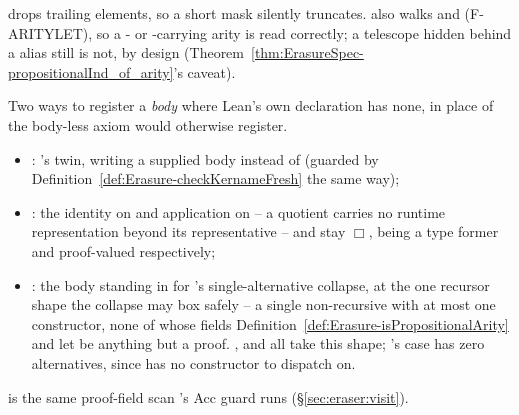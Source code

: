\begin{remark}
  drops trailing elements, so a short mask silently truncates.
 also walks  and  (F-ARITYLET), so a - or
-carrying arity is read correctly; a telescope hidden behind a  alias
still is not, by design (Theorem~\ref{thm:ErasureSpec-propositionalInd_of_arity}'s caveat).
\end{remark}

\begin{definition}
\label{def:Erasure-addRealizer}
\leanok
{} Two ways to register a \lbox{} \emph{body} where Lean's own declaration has none,
in place of the body-less axiom  would otherwise register.
\begin{itemize}
\item {}: 's twin, writing a supplied body instead of 
(guarded by Definition~\ref{def:Erasure-checkKernameFresh} the same way);
\item {}: the identity on  and application on  --
a quotient carries no runtime representation beyond its representative --  and
 stay $\Box$, being a type former and proof-valued respectively;
\item {}: the  body standing in for
's single-alternative collapse, at the one recursor shape the
collapse may box safely -- a single non-recursive  with at most one constructor, none
of whose fields Definition~\ref{def:Erasure-isPropositionalArity} and
 let be anything but a proof. ,  and
 all take this shape; 's case has zero alternatives, since
 has no constructor to dispatch on.
\end{itemize}
  is the same proof-field scan 's Acc guard
runs (\S\ref{sec:eraser:visit}).
\end{definition}

